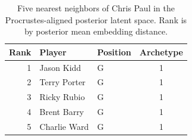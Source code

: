 \begin{table}[htbp]
  \centering\small
  \begin{tabular}{rllc}
    \toprule
    Rank & Player & Position & Archetype \\
    \midrule
    1 & Jason Kidd & G & 1 \\
    2 & Terry Porter & G & 1 \\
    3 & Ricky Rubio & G & 1 \\
    4 & Brent Barry & G & 1 \\
    5 & Charlie Ward & G & 1 \\
    \bottomrule
  \end{tabular}
  \caption{Five nearest neighbors of Chris Paul in the Procrustes-aligned posterior latent space. Rank is by posterior mean embedding distance.}
  \label{tab:Chris_Paul_neighbors}
\end{table}

